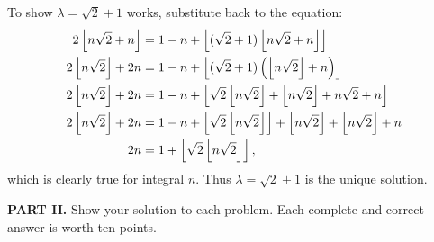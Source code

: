 \documentclass[11pt,paper=letter]{scrartcl}
\begin{document}
\begin{enumerate}[left=0pt]
To show $\lambda = \sqrt{2} + 1$ works, substitute back to the equation:
\begin{align*}
  2\left\lfloor n\sqrt{2} + n \right\rfloor &= 1 - n + \left\lfloor (\sqrt{2} + 1)\left\lfloor n\sqrt{2} + n \right\rfloor \right\rfloor \\
  2\left\lfloor n\sqrt{2} \right\rfloor + 2n &= 1 - n + \left\lfloor (\sqrt{2} + 1)\left( \left\lfloor n\sqrt{2} \right\rfloor + n \right) \right\rfloor \\
  2\left\lfloor n\sqrt{2} \right\rfloor + 2n &= 1 - n + \left\lfloor \sqrt{2}\left\lfloor n\sqrt{2} \right\rfloor + \left\lfloor n\sqrt{2} \right\rfloor + n\sqrt{2} + n \right\rfloor \\
  2\left\lfloor n\sqrt{2} \right\rfloor + 2n &= 1 - n + \left\lfloor \sqrt{2}\left\lfloor n\sqrt{2} \right\rfloor \right\rfloor + \left\lfloor n\sqrt{2} \right\rfloor + \left\lfloor n\sqrt{2} \right\rfloor + n \\
  2n &= 1 + \left\lfloor \sqrt{2}\left\lfloor n\sqrt{2} \right\rfloor \right\rfloor,
\end{align*}
which is clearly true for integral $n$. Thus $\lambda = \sqrt{2} + 1$ is the unique solution.

\end{enumerate}

\noindent\textbf{PART II.} Show your solution to each problem. Each complete and correct answer is worth ten points.
\end{document}
